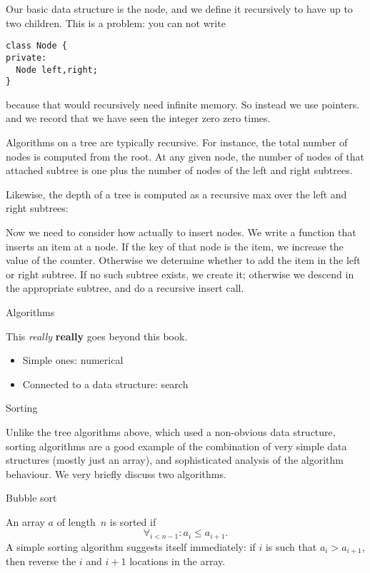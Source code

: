 Our basic data structure is the node, and we define it recursively to
have up to two children. This is a problem: you can not write
\begin{verbatim}
class Node {
private:
  Node left,right;
}
\end{verbatim}
because that would recursively need infinite memory. So instead we use pointers.
%
%
and we record that we have seen the integer zero zero times.

Algorithms on a tree are typically recursive. For instance, the total
number of nodes is computed from the root. At any given node, the
number of nodes of that attached subtree is one plus the number of
nodes of the left and right subtrees.
%

Likewise, the depth of a tree is computed as a recursive max over the
left and right subtrees:
%

Now we need to consider how actually to insert nodes. We write a
function that inserts an item at a node. If the key of that node is
the item, we increase the value of the counter. Otherwise we determine
whether to add the item in the left or right subtree. If no such
subtree exists, we create it; otherwise we descend in the appropriate
subtree, and do a recursive insert call.
%

 {Algorithms}

This \emph{really} \textbf{really} goes beyond this book.

\begin{itemize}
\item Simple ones: numerical
\item Connected to a data structure: search
\end{itemize}

 {Sorting}

Unlike the tree algorithms above, which used a non-obvious data
structure,
sorting algorithms are a good example of the combination of very
simple data structures (mostly just an array), and sophisticated
analysis of the algorithm behaviour. We very briefly discuss two
algorithms.

 {Bubble sort}

An array $a$ of length~$n$ is sorted if
\[ \forall_{i<n-1}\colon a_i\leq a_{i+1}. \]
A simple sorting algorithm suggests itself immediately: if $i$ is such
that $a_i>a_{i+1}$, then reverse the $i$ and $i+1$ locations in the
array.

